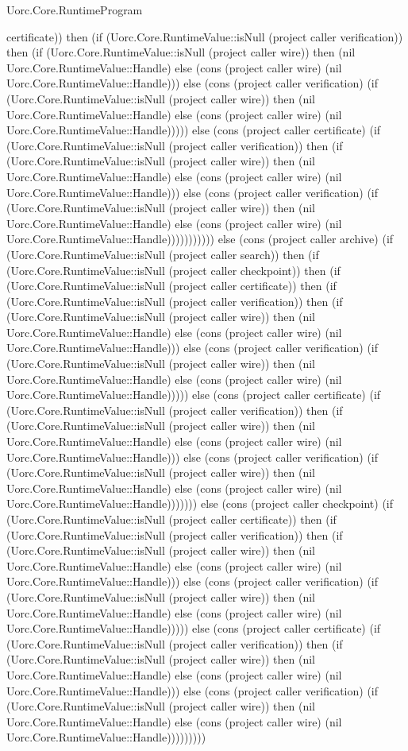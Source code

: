 \begin{lexlean}{Uorc.Core.RuntimeProgram}
\begin{semanticmodule}
{certificate)) then (if (Uorc.Core.RuntimeValue::isNull (project caller verification)) then (if (Uorc.Core.RuntimeValue::isNull (project caller wire)) then (nil Uorc.Core.RuntimeValue::Handle) else (cons (project caller wire) (nil Uorc.Core.RuntimeValue::Handle))) else (cons (project caller verification) (if (Uorc.Core.RuntimeValue::isNull (project caller wire)) then (nil Uorc.Core.RuntimeValue::Handle) else (cons (project caller wire) (nil Uorc.Core.RuntimeValue::Handle))))) else (cons (project caller certificate) (if (Uorc.Core.RuntimeValue::isNull (project caller verification)) then (if (Uorc.Core.RuntimeValue::isNull (project caller wire)) then (nil Uorc.Core.RuntimeValue::Handle) else (cons (project caller wire) (nil Uorc.Core.RuntimeValue::Handle))) else (cons (project caller verification) (if (Uorc.Core.RuntimeValue::isNull (project caller wire)) then (nil Uorc.Core.RuntimeValue::Handle) else (cons (project caller wire) (nil Uorc.Core.RuntimeValue::Handle))))))))))) else (cons (project caller archive) (if (Uorc.Core.RuntimeValue::isNull (project caller search)) then (if (Uorc.Core.RuntimeValue::isNull (project caller checkpoint)) then (if (Uorc.Core.RuntimeValue::isNull (project caller certificate)) then (if (Uorc.Core.RuntimeValue::isNull (project caller verification)) then (if (Uorc.Core.RuntimeValue::isNull (project caller wire)) then (nil Uorc.Core.RuntimeValue::Handle) else (cons (project caller wire) (nil Uorc.Core.RuntimeValue::Handle))) else (cons (project caller verification) (if (Uorc.Core.RuntimeValue::isNull (project caller wire)) then (nil Uorc.Core.RuntimeValue::Handle) else (cons (project caller wire) (nil Uorc.Core.RuntimeValue::Handle))))) else (cons (project caller certificate) (if (Uorc.Core.RuntimeValue::isNull (project caller verification)) then (if (Uorc.Core.RuntimeValue::isNull (project caller wire)) then (nil Uorc.Core.RuntimeValue::Handle) else (cons (project caller wire) (nil Uorc.Core.RuntimeValue::Handle))) else (cons (project caller verification) (if (Uorc.Core.RuntimeValue::isNull (project caller wire)) then (nil Uorc.Core.RuntimeValue::Handle) else (cons (project caller wire) (nil Uorc.Core.RuntimeValue::Handle))))))) else (cons (project caller checkpoint) (if (Uorc.Core.RuntimeValue::isNull (project caller certificate)) then (if (Uorc.Core.RuntimeValue::isNull (project caller verification)) then (if (Uorc.Core.RuntimeValue::isNull (project caller wire)) then (nil Uorc.Core.RuntimeValue::Handle) else (cons (project caller wire) (nil Uorc.Core.RuntimeValue::Handle))) else (cons (project caller verification) (if (Uorc.Core.RuntimeValue::isNull (project caller wire)) then (nil Uorc.Core.RuntimeValue::Handle) else (cons (project caller wire) (nil Uorc.Core.RuntimeValue::Handle))))) else (cons (project caller certificate) (if (Uorc.Core.RuntimeValue::isNull (project caller verification)) then (if (Uorc.Core.RuntimeValue::isNull (project caller wire)) then (nil Uorc.Core.RuntimeValue::Handle) else (cons (project caller wire) (nil Uorc.Core.RuntimeValue::Handle))) else (cons (project caller verification) (if (Uorc.Core.RuntimeValue::isNull (project caller wire)) then (nil Uorc.Core.RuntimeValue::Handle) else (cons (project caller wire) (nil Uorc.Core.RuntimeValue::Handle))))))))) }
\end{semanticmodule}
\end{lexlean}
